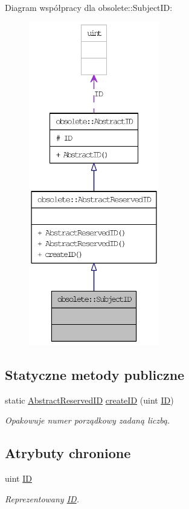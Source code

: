 Diagram współpracy dla obsolete::SubjectID:\nopagebreak
\begin{figure}[H]
\begin{center}
\leavevmode
\includegraphics[height=400pt]{classobsolete_1_1SubjectID__coll__graph}
\end{center}
\end{figure}
\subsection*{Statyczne metody publiczne}
\begin{DoxyCompactItemize}
\item 
static \hyperlink{classobsolete_1_1AbstractReservedID}{AbstractReservedID} \hyperlink{classobsolete_1_1AbstractReservedID_a38fa00bf6097ab9cff285c8480c8097e}{createID} (uint \hyperlink{classobsolete_1_1ID}{ID})
\begin{DoxyCompactList}\small\item\em Opakowuje numer porządkowy zadaną liczbą. \item\end{DoxyCompactList}\end{DoxyCompactItemize}
\subsection*{Atrybuty chronione}
\begin{DoxyCompactItemize}
\item 
uint \hyperlink{classobsolete_1_1AbstractID_a5f67fa1c7d96085f0ef41193b60b570c}{ID}
\begin{DoxyCompactList}\small\item\em Reprezentowany \hyperlink{classobsolete_1_1ID}{ID}. \item\end{DoxyCompactList}\end{DoxyCompactItemize}



